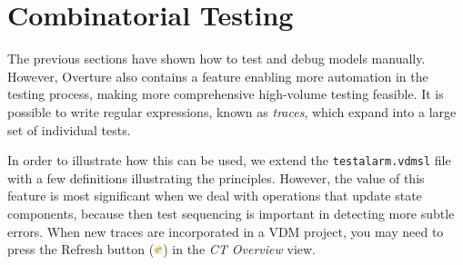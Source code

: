 \section{Combinatorial Testing}\label{sec:CT}
The previous sections have shown how to test and debug models manually. However, Overture also contains a feature enabling more automation in the testing process, making more comprehensive high-volume testing feasible. It is possible to write regular expressions, known as \emph{traces}, which expand into a large set of individual tests.

In order to illustrate how this can be used, we extend the \texttt{testalarm.vdmsl} file with a few definitions illustrating the principles. However, the value of this feature is most significant
when we deal with operations that update state components, because then test sequencing is important in detecting more subtle errors. When new traces are incorporated in a VDM project, you may need
to press the \textsf{Refresh} button (\includegraphics[width=0.02\textwidth]{figures/refresh}) in the
\emph{CT Overview} view.

